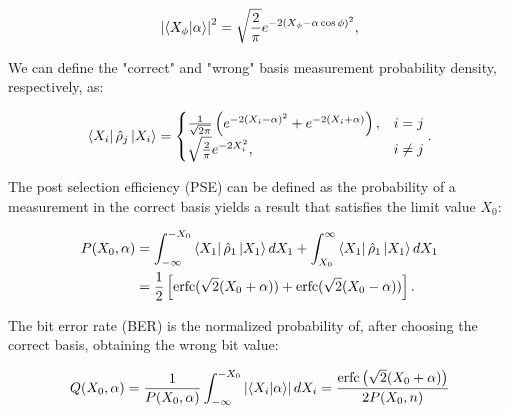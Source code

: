\begin{equation}
\left|\braket{X_\phi|\alpha}\right|^2=\sqrt{\frac{2}{\pi}}e^{-2(X_\phi-\alpha\cos\phi)^2},
\end{equation}

We can define the "correct" and "wrong" basis measurement probability density, respectively, as:

\begin{equation}\label{eq:probdensity}
\bra{X_i}\hat{\rho}_j\ket{X_i}=
\begin{cases}
\frac{1}{\sqrt{2\pi}}\left(e^{-2(X_i-\alpha)^2}+e^{-2(X_i+\alpha)}\right), & i=j\\
\sqrt{\frac{2}{\pi}}e^{-2X_i^2}, &i\neq j
\end{cases}.
\end{equation}

The post selection efficiency (PSE) can be defined as the probability of a measurement in the correct basis yields a result that satisfies the limit value $X_0$:

\begin{equation}\label{eq:postselecteff}
\begin{aligned}
P(X_0,\alpha)&=\int^{-X_0}_{-\infty}\bra{X_1}\hat{\rho}_1\ket{X_1}dX_1+\int^{\infty}_{X_0}\bra{X_1}\hat{\rho}_1\ket{X_1}dX_1\\
&=\frac{1}{2}\left[\text{erfc}(\sqrt{2}(X_0+\alpha))+\text{erfc}(\sqrt{2}(X_0-\alpha))\right].
\end{aligned}
\end{equation}

The bit error rate (BER) is the normalized probability of, after choosing the correct basis, obtaining the wrong bit value:

\begin{equation}\label{eq:biterrorratio}
Q(X_0,\alpha)=\frac{1}{P(X_0,\alpha)}\int_{-\infty}^{-X_0}\left|\braket{X_i|\alpha}\right|dX_i=\frac{\text{erfc}\left(\sqrt{2}(X_0+\alpha)\right)}{2P(X_0,n)}
\end{equation}


